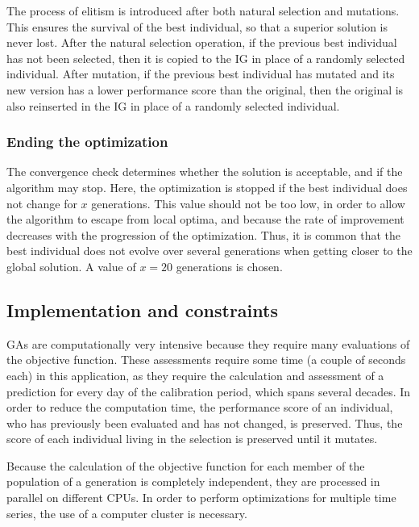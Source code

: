 \documentclass{ametsoc}
\begin{document}
The process of elitism is introduced after both natural selection and mutations. This ensures the survival of the best individual, so that a superior solution is never lost. After the natural selection operation, if the previous best individual has not been selected, then it is copied to the IG in place of a randomly selected individual. After mutation, if the previous best individual has mutated and its new version has a lower performance score than the original, then the original is also reinserted in the IG in place of a randomly selected individual.


\subsubsection{Ending the optimization}

The convergence check determines whether the solution is acceptable, and if the algorithm may stop. Here, the optimization is stopped if the best individual does not change for $x$ generations. This value should not be too low, in order to allow the algorithm to escape from local optima, and because the rate of improvement decreases with the progression of the optimization. Thus, it is common that the best individual does not evolve over several generations when getting closer to the global solution. A value of $x=20$ generations is chosen.


\subsection{Implementation and constraints}

GAs are computationally very intensive because they require many evaluations of the objective function. These assessments require some time (a couple of seconds each) in this application, as they require the calculation and assessment of a prediction for every day of the calibration period, which spans several decades. In order to reduce the computation time, the performance score of an individual, who has previously been evaluated and has not changed, is preserved. Thus, the score of each individual living in the selection is preserved until it mutates.

Because the calculation of the objective function for each member of the population of a generation is completely independent, they are processed in parallel on different CPUs. In order to perform optimizations for multiple time series, the use of a computer cluster is necessary.
\end{document}
